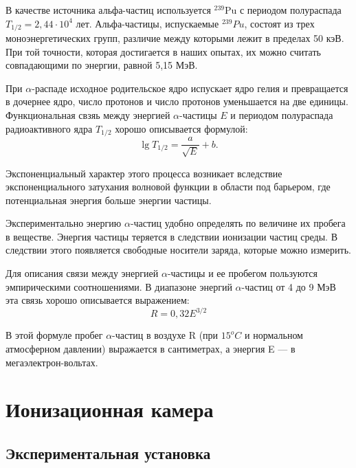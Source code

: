 \documentclass[a4paper,12pt]{article} %
\begin{document}
        В качестве источника альфа-частиц используется $ ^{239}  $Pu  с периодом полураспада $ T_{1/2} = 2,44 \cdot 10^4 $ лет.
        Альфа-частицы, испускаемые $ ^{239} Pu $, состоят из трех моноэнергетических групп, различие между которыми лежит в пределах 50 кэВ.
        При той точности, которая достигается в наших опытах, их можно считать совпадающими по энергии, равной 5,15 МэВ.\par
        При $\alpha$-распаде исходное родительское ядро испускает ядро гелия и превращается в дочернее ядро, число протонов и число протонов уменьшается на две единицы.
        Функциональная свзяь между энергией $\alpha$-частицы $E$ и периодом полураспада радиоактивного ядра $T_{1/2}$ хорошо описывается формулой:
        \begin{equation}
            \lg T_{1/2} = \frac{a}{\sqrt{E}} + b.
        \end{equation}\par
        Экспоненциальный характер этого процесса возникает вследствие экспоненциального затухания волновой функции в области под барьером, где потенциальная энергия больше энергии частицы.\par
        Экспериментально энергию $\alpha$-частиц удобно определять по величине их пробега в веществе.
        Энергия частицы теряется в следствии ионизации частиц среды. 
        В следствии этого появляется свободные носители заряда, которые можно измерить.\par
        Для описания связи между энергией $\alpha$-частицы и ее пробегом пользуются эмпирическими соотношениями. 
        В диапазоне энергий $\alpha$-частиц от 4 до 9 МэВ эта связь хорошо описывается выражением:
        \begin{equation}
            R = 0,32E^{3/2}
        \end{equation}\par
        В этой формуле пробег $\alpha$-частиц в воздухе R (при $15 ^oC$ и нормальном атмосферном давлении) выражается в сантиметрах, а энергия E — в мегаэлектрон-вольтах.
    \newpage

    \section{Ионизационная камера}
        
        \subsection{Экспериментальная установка}    
\end{document}
